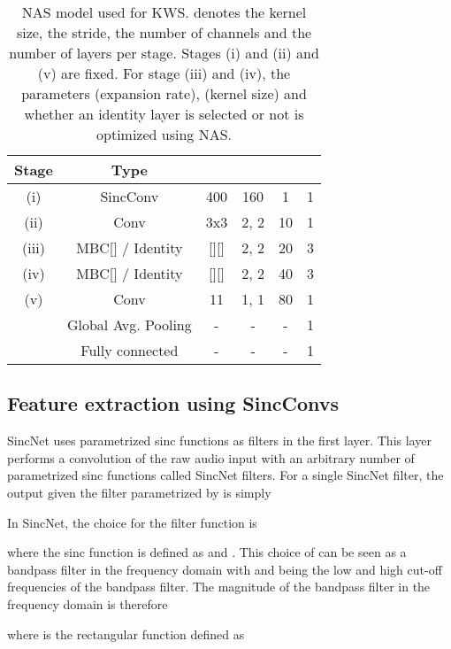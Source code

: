 \documentclass[a4paper]{article}
\begin{document}
\begin{table}[t!]
	\caption{NAS model used for KWS.  denotes the kernel size,  the stride,  the number of channels and  the number of layers per stage. Stages (i) and (ii) and (v) are fixed. For stage (iii) and (iv), the parameters  (expansion rate),  (kernel size) and whether an identity layer is selected or not is optimized using NAS.}
	\begin{center}
		\begin{tabular}{cccccc}
			\toprule
			\textbf{Stage} & \textbf{Type} &  &  &  &  \\
			\midrule
			(i) & SincConv & 400 & 160 & 1 & 1 \\

			(ii) & Conv & 3x3 & 2, 2 & 10 & 1 \\

			(iii) & MBC[] / Identity & [][] & 2, 2 & 20& 3 \\

			(iv) & MBC[] / Identity & [][] & 2, 2 & 40 & 3 \\

			(v) & Conv & 11 & 1, 1 & 80 & 1 \\
			& Global Avg. Pooling & - & - & - & 1\\
			& Fully connected & - & - & - & 1\\
			\bottomrule
		\end{tabular}
	\end{center}
	\label{model_structure}
\end{table}

\subsection{Feature extraction using SincConvs}
SincNet \cite{Ravanelli2018} uses parametrized sinc functions as filters in the first layer. This layer performs a convolution of the raw audio input  with an arbitrary number of parametrized sinc functions called SincNet filters. For a single SincNet filter, the output  given the filter  parametrized by  is simply

In SincNet, the choice for the filter function  is

where the sinc function is defined as  and . This choice of  can be seen as a bandpass filter in the frequency domain with  and  being the low and high cut-off frequencies of the bandpass filter. The magnitude of the bandpass filter in the frequency domain is therefore

where  is the rectangular function defined as
\end{document}

